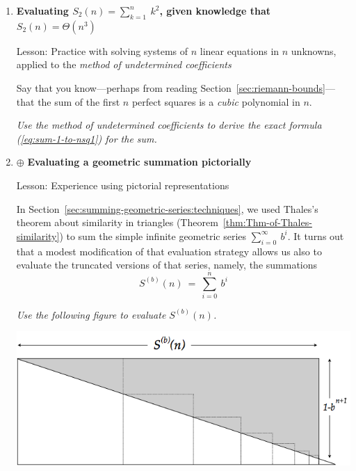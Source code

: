 \begin{enumerate}
{\em Show how to use this machine in order to compute the sum of the first $n$ integers.}

\smallskip

{\em Hint.}
Try to think creatively.  Think of how one can (mathematically) relate the first $n$ integers to their squares.
\medskip

\medskip\item
{\bf Evaluating $S_2(n) = \sum_{k=1}^n \ k^2$, given knowledge that $S_2(n) = \Theta(n^3)$}

{\sc Lesson:} Practice with solving systems of $n$ linear equations in $n$ unknowns, applied to the {\it method of undetermined coefficients}


\smallskip

Say that you know---perhaps from reading Section~\ref{sec:riemann-bounds}---that the sum of the first $n$ perfect squares is a {\em cubic} polynomial in $n$.

\smallskip

{\em Use the method of undetermined coefficients to derive the exact formula (\ref{eq:sum-1-to-nsq1}) for the sum.}

\medskip\item
$\oplus$
{\bf Evaluating a geometric summation pictorially}

{\sc Lesson:} Experience using pictorial representations

\smallskip

In Section~\ref{sec:summing-geometric-series:techniques}, we used Thales's theorem about similarity in triangles (Theorem~\ref{thm:Thm-of-Thales-similarity}) to sum the simple infinite geometric series $\sum_{i=0}^\infty \ b^i$.  It turns out that a modest modification of that evaluation strategy allows us also to evaluate the truncated versions of that series, namely, the summations
\[ S^{(b)}(n) \ = \ \sum_{i=0}^n \ b^i \]

{\em Use the following figure to evaluate $S^{(b)}(n)$.}

\centerline{\includegraphics[scale=0.4]{FiguresArithmetic/ThalesGeometricSumFinite}}


\end{enumerate}
